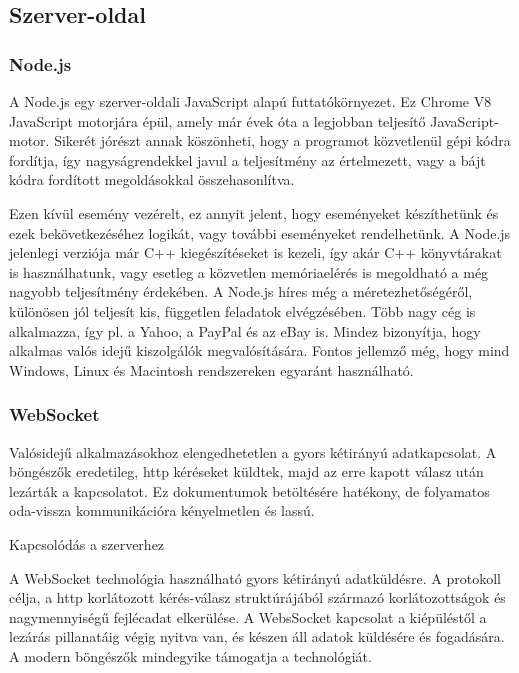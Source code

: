 \documentclass[bibliography=totocnumbered]{article}
\begin{document}
\subsection{Szerver-oldal}


\subsubsection{Node.js}

A Node.js egy szerver-oldali JavaScript alapú futtatókörnyezet. Ez
Chrome V8 JavaScript motorjára épül, amely már évek óta a legjobban
teljesítő JavaScript-motor. Sikerét jórészt annak köszönheti, hogy a
programot közvetlenül gépi kódra fordítja, így nagyságrendekkel javul a
teljesítmény az értelmezett, vagy a bájt kódra fordított megoldásokkal
összehasonlítva.

Ezen kívül esemény vezérelt, ez annyit jelent, hogy eseményeket
készíthetünk és ezek bekövetkezéséhez logikát, vagy további eseményeket
rendelhetünk. A Node.js jelenlegi verziója már C++ kiegészítéseket is
kezeli, így akár C++ könyvtárakat is használhatunk, vagy esetleg a
közvetlen memóriaelérés is megoldható a még nagyobb teljesítmény
érdekében. A Node.js híres még a méretezhetőségéről, különösen jól
teljesít kis, független feladatok elvégzésében. Több nagy cég is
alkalmazza, így pl. a Yahoo, a PayPal és az eBay is. Mindez bizonyítja,
hogy alkalmas valós idejű kiszolgálók megvalósítására. Fontos jellemző
még, hogy mind Windows, Linux és Macintosh rendszereken egyaránt
használható.


\subsubsection{WebSocket}

Valósidejű alkalmazásokhoz elengedhetetlen a gyors kétirányú
adatkapcsolat. A böngészők eredetileg, http kéréseket küldtek, majd az
erre kapott válasz után lezárták a kapcsolatot. Ez dokumentumok
betöltésére hatékony, de folyamatos oda-vissza kommunikációra
kényelmetlen és lassú.

Kapcsolódás a szerverhez

A WebSocket \cite{3} technológia használható gyors kétirányú adatküldésre. A
protokoll célja, a http korlátozott kérés-válasz struktúrájából származó
korlátozottságok és nagymennyiségű fejlécadat elkerülése. A WebsSocket
kapcsolat a kiépüléstől a lezárás pillanatáig végig nyitva van, és
készen áll adatok küldésére és fogadására. A modern böngészők mindegyike
támogatja a technológiát.
\end{document}
